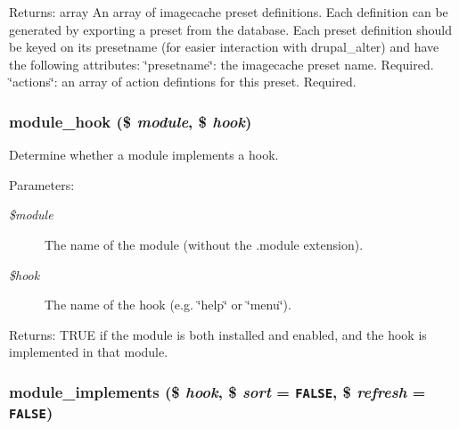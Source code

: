 \begin{Desc}
\item[Returns:]array An array of imagecache preset definitions. Each definition can be generated by exporting a preset from the database. Each preset definition should be keyed on its presetname (for easier interaction with drupal\_\-alter) and have the following attributes: \char`\"{}presetname\char`\"{}: the imagecache preset name. Required. \char`\"{}actions\char`\"{}: an array of action defintions for this preset. Required. \end{Desc}
\hypertarget{group__hooks_g0d7a0b03039c561b63424b2a6cf6103f}{
\subsubsection[{module\_\-hook}]{\setlength{\rightskip}{0pt plus 5cm}module\_\-hook (\$ {\em module}, \/  \$ {\em hook})}}
\label{group__hooks_g0d7a0b03039c561b63424b2a6cf6103f}


Determine whether a module implements a hook.

\begin{Desc}
\item[Parameters:]
\begin{description}
\item[{\em \$module}]The name of the module (without the .module extension). \item[{\em \$hook}]The name of the hook (e.g. \char`\"{}help\char`\"{} or \char`\"{}menu\char`\"{}). \end{description}
\end{Desc}
\begin{Desc}
\item[Returns:]TRUE if the module is both installed and enabled, and the hook is implemented in that module. \end{Desc}
\hypertarget{group__hooks_g55275aa404ced19ade543dec984cb93f}{
\subsubsection[{module\_\-implements}]{\setlength{\rightskip}{0pt plus 5cm}module\_\-implements (\$ {\em hook}, \/  \$ {\em sort} = {\tt FALSE}, \/  \$ {\em refresh} = {\tt FALSE})}}
\label{group__hooks_g55275aa404ced19ade543dec984cb93f}


